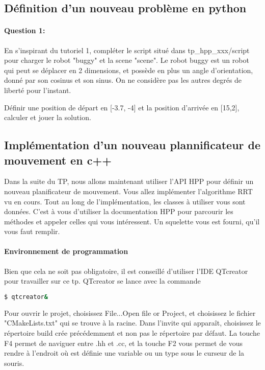 \documentclass {article}
\begin{document}
\subsection{D\'efinition d'un nouveau probl\`eme en python}
\paragraph {Question 1:}
En s'inspirant du tutoriel 1, compl\'eter le script situ\'e dans tp\_hpp\_xxx/script pour 
charger le robot "buggy" et la scene "scene".
Le robot buggy est un robot qui peut se d\'eplacer en 2 dimensions, et poss\`ede en plus un angle
d'orientation, donn\'e par son cosinus et son sinus. On ne consid\`ere pas les autres degr\'es de
libert\'e pour l'instant.

D\'efinir une position de d\'epart en [-3.7, -4] et la position d'arriv\'ee en [15,2],
calculer et jouer la solution.

\subsection{Impl\'ementation d'un nouveau plannificateur de mouvement en c++}
Dans la suite du TP, nous allons maintenant utiliser l'API HPP pour d\'efinir un nouveau planificateur de mouvement.
Vous allez impl\'ementer l'algorithme RRT vu en cours.
Tout au long de l'impl\'ementation, les classes \`a utiliser vous sont donn\'ees.
C'est \`a vous d'utiliser la documentation HPP pour parcourir les m\'ethodes et appeler celles qui vous int\'eressent.
Un squelette vous est fourni, qu'il vous faut remplir.

\paragraph{Environnement de programmation}
Bien que cela ne soit pas obligatoire, il est conseill\'e d'utiliser l'IDE QTcreator pour travailler sur ce tp.
QTcreator se lance avec la commande 
\begin{lstlisting}[language=bash]
  $ qtcreator&
\end{lstlisting}

Pour ouvrir le projet, choisissez File...Open file or Project, et choisissez le fichier "CMakeLists.txt"
qui se trouve \`a la racine. Dans l'invite qui appara\^it, choisissez le r\'epertoire build cr\'ee pr\'ec\'edemment et non
pas le r\'epertoire par d\'efaut. La touche F4 permet de naviguer entre .hh et .cc, et la touche F2 vous 
permet de vous rendre \`a l'endroit o\`u est d\'efinie une variable ou un type sous le curseur de la souris.
\end{document}
